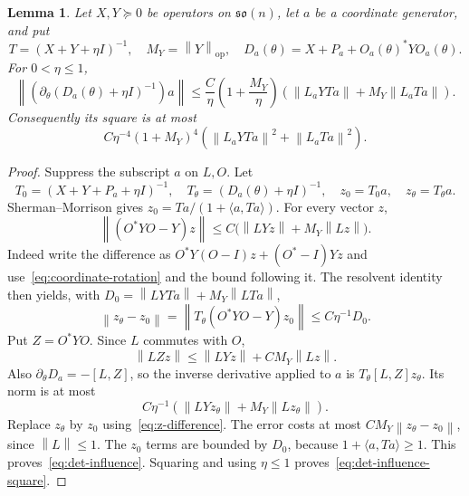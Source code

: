 \documentclass[11pt]{article}
\newtheorem{lemma}[theorem]{Lemma}
\theoremstyle{definition}\newtheorem{definition}[theorem]{Definition}
\theoremstyle{remark}\newtheorem{remark}[theorem]{Remark}
\newcommand{\g}{\mathfrak{so}(n)}
\newcommand{\op}{\mathrm{op}}
\newcommand{\ip}[2]{\langle#1,#2\rangle}
\newcommand{\norm}[1]{\left\lVert#1\right\rVert}
\begin{document}
\begin{lemma}\label{lem:det-influence}
Let $X,Y\succeq0$ be operators on $\g$, let $a$ be a coordinate generator, and put
\[
 T=(X+Y+\eta I)^{-1},\quad M_Y=\norm Y_{\op},\quad
 D_a(\theta)=X+P_a+O_a(\theta)^*Y O_a(\theta).
\]
For $0<\eta\le1$,
\begin{equation}\label{eq:det-influence}
 \left\|\left(\partial_\theta(D_a(\theta)+\eta I)^{-1}\right)a\right\|
 \le \frac C\eta\left(1+\frac{M_Y}\eta\right)
 \left(\norm{L_aYT a}+M_Y\norm{L_aTa}\right).
\end{equation}
Consequently its square is at most
\begin{equation}\label{eq:det-influence-square}
 C\eta^{-4}(1+M_Y)^4
       \left(\norm{L_aYT a}^2+\norm{L_aTa}^2\right).
\end{equation}
\end{lemma}
\begin{proof}
Suppress the subscript $a$ on $L,O$. Let
\[
 T_0=(X+Y+P_a+\eta I)^{-1},\quad
 T_\theta=(D_a(\theta)+\eta I)^{-1},\quad
 z_0=T_0a,\quad z_\theta=T_\theta a.
\]
Sherman--Morrison gives $z_0=Ta/(1+\ip a{Ta})$. For every vector $z$,
\begin{equation}\label{eq:DeltaY}
 \norm{(O^*YO-Y)z}
 \le C\bigl(\norm{LYz}+M_Y\norm{Lz}\bigr).
\end{equation}
Indeed write the difference as $O^*Y(O-I)z+(O^*-I)Yz$ and use~\eqref{eq:coordinate-rotation} and the bound following it. The resolvent identity then yields, with $D_0=\norm{LYTa}+M_Y\norm{LTa}$,
\begin{equation}\label{eq:z-difference}
 \norm{z_\theta-z_0}
 =\norm{T_\theta(O^*YO-Y)z_0}
 \le C\eta^{-1}D_0.
\end{equation}
Put $Z=O^*YO$. Since $L$ commutes with $O$,
\[
 \norm{LZz}\le\norm{LYz}+CM_Y\norm{Lz}.
\]
Also $\partial_\theta D_a=-[L,Z]$, so the inverse derivative applied to $a$ is $T_\theta[L,Z]z_\theta$. Its norm is at most
\[
 C\eta^{-1}\left(\norm{LYz_\theta}+M_Y\norm{Lz_\theta}\right).
\]
Replace $z_\theta$ by $z_0$ using~\eqref{eq:z-difference}. The error costs at most $CM_Y\norm{z_\theta-z_0}$, since $\norm L\le1$. The $z_0$ terms are bounded by $D_0$, because $1+\ip a{Ta}\ge1$. This proves~\eqref{eq:det-influence}. Squaring and using $\eta\le1$ proves~\eqref{eq:det-influence-square}.
\end{proof}
\end{document}
